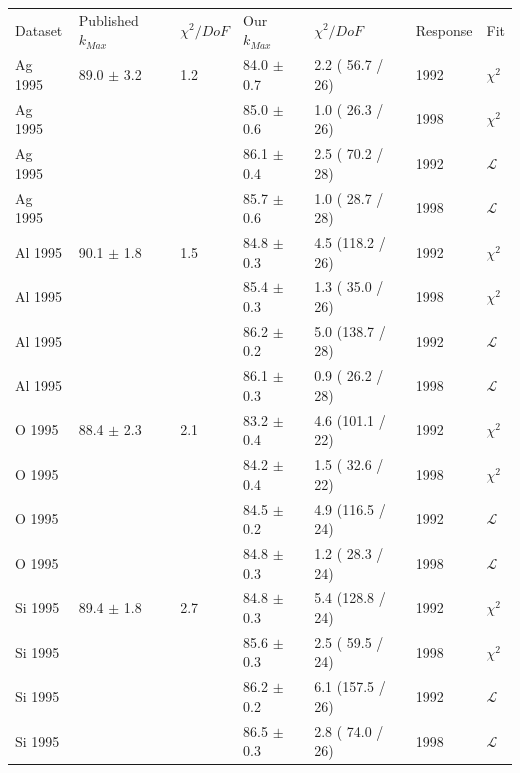 \begin{table}[h]
  \begin{center}
    \begin{tabular}{|l||l|l|l|l|l|l|}
      \hline
      Dataset & Published $k_{Max}$ & $\chi^2 / DoF$ & Our $k_{Max}$ & $\chi^2 / DoF$  & Response & Fit \\
      \hhline{|=||=|=|=|=|=|=|}


      Ag 1995 & 89.0 $\pm$ 3.2 & 1.2 & 84.0 $\pm$ 0.7 & 2.2 ( 56.7 / 26) & 1992 & $\chi^2$ \\
      Ag 1995 &                &     & 85.0 $\pm$ 0.6 & 1.0 ( 26.3 / 26) & 1998 & $\chi^2$ \\
      Ag 1995 &                &     & 86.1 $\pm$ 0.4 & 2.5 ( 70.2 / 28) & 1992 & $\mathcal{L}$ \\
      Ag 1995 &                &     & 85.7 $\pm$ 0.6 & 1.0 ( 28.7 / 28) & 1998 & $\mathcal{L}$ \\
      \hline
      Al 1995 & 90.1 $\pm$ 1.8 & 1.5 & 84.8 $\pm$ 0.3 & 4.5 (118.2 / 26) & 1992 & $\chi^2$ \\
      Al 1995 &                &     & 85.4 $\pm$ 0.3 & 1.3 ( 35.0 / 26) & 1998 & $\chi^2$ \\
      Al 1995 &                &     & 86.2 $\pm$ 0.2 & 5.0 (138.7 / 28) & 1992 & $\mathcal{L}$ \\
      Al 1995 &                &     & 86.1 $\pm$ 0.3 & 0.9 ( 26.2 / 28) & 1998 & $\mathcal{L}$ \\
      \hline
      O  1995 & 88.4 $\pm$ 2.3 & 2.1 & 83.2 $\pm$ 0.4 & 4.6 (101.1 / 22) & 1992 & $\chi^2$ \\
      O  1995 &                &     & 84.2 $\pm$ 0.4 & 1.5 ( 32.6 / 22) & 1998 & $\chi^2$ \\
      O  1995 &                &     & 84.5 $\pm$ 0.2 & 4.9 (116.5 / 24) & 1992 & $\mathcal{L}$ \\
      O  1995 &                &     & 84.8 $\pm$ 0.3 & 1.2 ( 28.3 / 24) & 1998 & $\mathcal{L}$ \\
      \hline
      Si 1995 & 89.4 $\pm$ 1.8 & 2.7 & 84.8 $\pm$ 0.3 & 5.4 (128.8 / 24) & 1992 & $\chi^2$ \\
      Si 1995 &                &     & 85.6 $\pm$ 0.3 & 2.5 ( 59.5 / 24) & 1998 & $\chi^2$ \\
      Si 1995 &                &     & 86.2 $\pm$ 0.2 & 6.1 (157.5 / 26) & 1992 & $\mathcal{L}$ \\
      Si 1995 &                &     & 86.5 $\pm$ 0.3 & 2.8 ( 74.0 / 26) & 1998 & $\mathcal{L}$ \\

\end{tabular}
\end{center}
\end{table}
